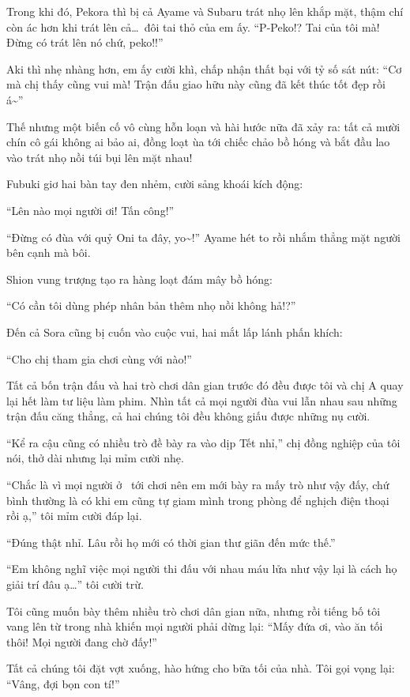 \documentclass[../main.tex]{subfiles}
\begin{document}
Trong khi đó, Pekora thì bị cả Ayame và Subaru trát nhọ lên khắp mặt, thậm chí còn ác hơn khi trát lên cả\dots\ đôi tai thỏ của em ấy. ``P-Peko!? Tai của tôi mà! Đừng có trát lên nó chứ, peko!!''

Aki thì nhẹ nhàng hơn, em ấy cười khì, chấp nhận thất bại với tỷ số sát nút: ``Cơ mà chị thấy cũng vui mà! Trận đấu giao hữu này cũng đã kết thúc tốt đẹp rồi á\~{}''

Thế nhưng một biến cố vô cùng hỗn loạn và hài hước nữa đã xảy ra: tất cả mười chín cô gái không ai bảo ai, đồng loạt ùa tới chiếc chảo bồ hóng và bắt đầu lao vào trát nhọ nồi túi bụi lên mặt nhau!

Fubuki giơ hai bàn tay đen nhẻm, cười sảng khoái kích động:

``Lên nào mọi người ơi! Tấn công!''

``Đừng có đùa với quỷ Oni ta đây, yo\~{}!'' Ayame hét to rồi nhắm thẳng mặt người bên cạnh mà bôi.

Shion vung trượng tạo ra hàng loạt đám mây bồ hóng:

``Có cần tôi dùng phép nhân bản thêm nhọ nồi không hả!?''

Đến cả Sora cũng bị cuốn vào cuộc vui, hai mắt lấp lánh phấn khích:

``Cho chị tham gia chơi cùng với nào!''

Tất cả bốn trận đấu và hai trò chơi dân gian trước đó đều được tôi và chị A quay lại hết làm tư liệu làm phim. Nhìn tất cả mọi người đùa vui lẫn nhau sau những trận đấu căng thẳng, cả hai chúng tôi đều không giấu được những nụ cười.

``Kể ra cậu cũng có nhiều trò đề bày ra vào dịp Tết nhỉ,'' chị đồng nghiệp của tôi nói, thở dài nhưng lại mỉm cười nhẹ.

``Chắc là vì mọi người ở \hll\ tới chơi nên em mới bày ra mấy trò như vậy đấy, chứ bình thường là có khi em cũng tự giam mình trong phòng để nghịch điện thoại rồi ạ,'' tôi mỉm cười đáp lại.

``Đúng thật nhỉ. Lâu rồi họ mới có thời gian thư giãn đến mức thế.''

``Em không nghĩ việc mọi người thi đấu với nhau máu lửa như vậy lại là cách họ giải trí đâu ạ\dots'' tôi cười trừ.

\il

Tôi cũng muốn bày thêm nhiều trò chơi dân gian nữa, nhưng rồi tiếng bố tôi vang lên từ trong nhà khiến mọi người phải dừng lại: ``Mấy đứa ơi, vào ăn tối thôi! Mọi người đang chờ đấy!''

Tất cả chúng tôi đặt vợt xuống, hào hứng cho bữa tối của nhà. Tôi gọi vọng lại: ``Vâng, đợi bọn con tí!''
\end{document}
